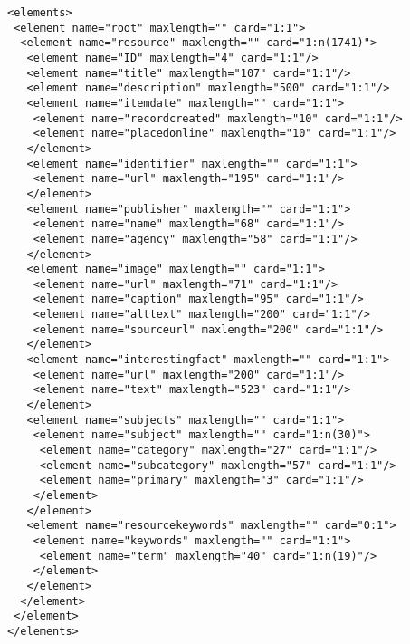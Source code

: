 \begin{BVerbatim}
<elements>
 <element name="root" maxlength="" card="1:1">
  <element name="resource" maxlength="" card="1:n(1741)">
   <element name="ID" maxlength="4" card="1:1"/>
   <element name="title" maxlength="107" card="1:1"/>
   <element name="description" maxlength="500" card="1:1"/>
   <element name="itemdate" maxlength="" card="1:1">
    <element name="recordcreated" maxlength="10" card="1:1"/>
    <element name="placedonline" maxlength="10" card="1:1"/>
   </element>
   <element name="identifier" maxlength="" card="1:1">
    <element name="url" maxlength="195" card="1:1"/>
   </element>
   <element name="publisher" maxlength="" card="1:1">
    <element name="name" maxlength="68" card="1:1"/>
    <element name="agency" maxlength="58" card="1:1"/>
   </element>
   <element name="image" maxlength="" card="1:1">
    <element name="url" maxlength="71" card="1:1"/>
    <element name="caption" maxlength="95" card="1:1"/>
    <element name="alttext" maxlength="200" card="1:1"/>
    <element name="sourceurl" maxlength="200" card="1:1"/>
   </element>
   <element name="interestingfact" maxlength="" card="1:1">
    <element name="url" maxlength="200" card="1:1"/>
    <element name="text" maxlength="523" card="1:1"/>
   </element>
   <element name="subjects" maxlength="" card="1:1">
    <element name="subject" maxlength="" card="1:n(30)">
     <element name="category" maxlength="27" card="1:1"/>
     <element name="subcategory" maxlength="57" card="1:1"/>
     <element name="primary" maxlength="3" card="1:1"/>
    </element>
   </element>
   <element name="resourcekeywords" maxlength="" card="0:1">
    <element name="keywords" maxlength="" card="1:1">
     <element name="term" maxlength="40" card="1:n(19)"/>
    </element>
   </element>
  </element>
 </element>
</elements>
\end{BVerbatim}
